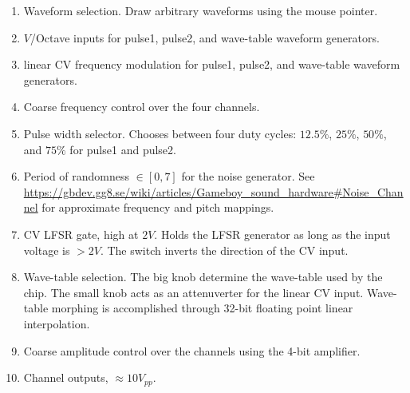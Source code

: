 \documentclass[12pt,a4paper]{article}
\begin{document}
\clearpage
\begin{enumerate}
  \item Waveform selection. Draw arbitrary waveforms using the mouse pointer.
  \item $V$/Octave inputs for pulse1, pulse2, and wave-table waveform generators.
  \item linear CV frequency modulation for pulse1, pulse2, and wave-table waveform generators.
  \item Coarse frequency control over the four channels.
  \item Pulse width selector. Chooses between four duty cycles: $12.5\%$, $25\%$, $50\%$, and $75\%$ for pulse1 and pulse2.
  \item Period of randomness $\in [0, 7]$ for the noise generator. See \url{https://gbdev.gg8.se/wiki/articles/Gameboy_sound_hardware#Noise_Channel} for approximate frequency and pitch mappings.
  \item CV LFSR gate, high at $2V$. Holds the LFSR generator as long as the input voltage is $>2V$. The switch inverts the direction of the CV input.
  \item Wave-table selection. The big knob determine the wave-table used by the chip. The small knob acts as an attenuverter for the linear CV input. Wave-table morphing is accomplished through 32-bit floating point linear interpolation.
  \item Coarse amplitude control over the channels using the 4-bit amplifier.
  \item Channel outputs, ${\approx}10V_{pp}$.
\end{enumerate}


\clearpage
\renewcommand\refname{References \& Acknowledgments}
\nocite{*}


\end{document}

